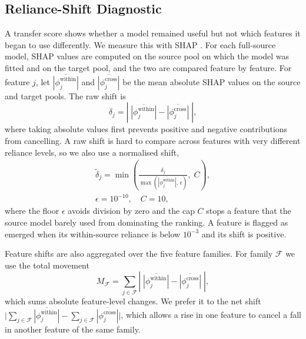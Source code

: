 \documentclass[conference]{IEEEtran}
\begin{document}
\subsection{Reliance-Shift Diagnostic}
\label{sec:method-shap}
A transfer score shows whether a model remained useful but not which features it began to use differently. We measure this with SHAP \cite{lundberg2017shap}. For each full-source model, SHAP values are computed on the source pool on which the model was fitted and on the target pool, and the two are compared feature by feature. For feature $j$, let $\overline{|\phi^{\mathrm{within}}_j|}$ and $\overline{|\phi^{\mathrm{cross}}_j|}$ be the mean absolute SHAP values on the source and target pools. The raw shift is
\begin{equation}
\delta_j = \left|\;\overline{\left|\phi^{\mathrm{within}}_j\right|} - \overline{\left|\phi^{\mathrm{cross}}_j\right|}\;\right|,
\label{eq:delta-j-raw}
\end{equation}
where taking absolute values first prevents positive and negative contributions from cancelling. A raw shift is hard to compare across features with very different reliance levels, so we also use a normalised shift,
\begin{equation}
\begin{split}
\widetilde{\delta}_j = \min\!\left(\frac{\delta_j}{\max\!\left(\overline{\left|\phi^{\mathrm{within}}_j\right|},\, \epsilon\right)},\; C\right),\\
\epsilon = 10^{-10},\quad C = 10,
\end{split}
\label{eq:delta-j-normalized}
\end{equation}
where the floor $\epsilon$ avoids division by zero and the cap $C$ stops a feature that the source model barely used from dominating the ranking. A feature is flagged as emerged when its within-source reliance is below $10^{-3}$ and its shift is positive.

Feature shifts are also aggregated over the five feature families. For family $\mathcal{F}$ we use the total movement
\begin{equation}
M_{\mathcal{F}} = \sum_{j \in \mathcal{F}} \left|\;\overline{\left|\phi^{\mathrm{within}}_j\right|} - \overline{\left|\phi^{\mathrm{cross}}_j\right|}\;\right|,
\label{eq:total-movement}
\end{equation}
which sums absolute feature-level changes. We prefer it to the net shift $\bigl|\sum_{j\in\mathcal{F}} \overline{|\phi^{\mathrm{within}}_j|} - \sum_{j\in\mathcal{F}} \overline{|\phi^{\mathrm{cross}}_j|}\bigr|$, which allows a rise in one feature to cancel a fall in another feature of the same family.
\end{document}
